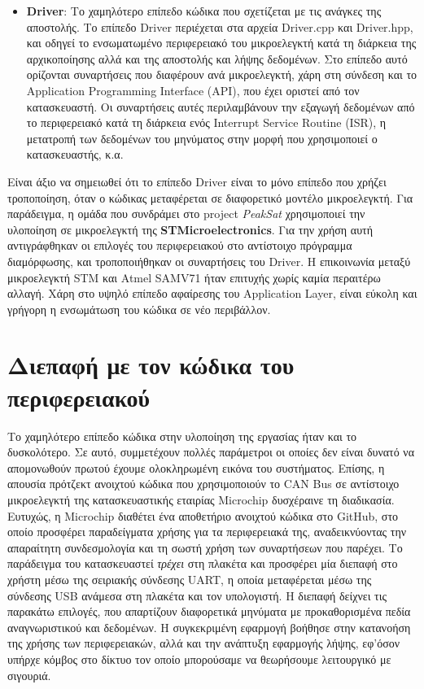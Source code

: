 \documentclass[a4paper,nobib,justified]{tufte-book}
\begin{document}
\begin{itemize}
	\item \textbf{Driver}: Το χαμηλότερο επίπεδο κώδικα που σχετίζεται με τις ανάγκες της αποστολής. Το επίπεδο Driver περιέχεται στα αρχεία Driver.cpp και Driver.hpp, και οδηγεί το ενσωματωμένο περιφερειακό του μικροελεγκτή κατά τη διάρκεια της αρχικοποίησης αλλά και της αποστολής και λήψης δεδομένων. Στο επίπεδο αυτό ορίζονται συναρτήσεις που διαφέρουν ανά μικροελεγκτή, χάρη στη σύνδεση και το Application Programming Interface (API), που έχει οριστεί από τον κατασκευαστή. Οι συναρτήσεις αυτές περιλαμβάνουν την εξαγωγή δεδομένων από το περιφερειακό κατά τη διάρκεια ενός Interrupt Service Routine (ISR), η μετατροπή των δεδομένων του μηνύματος στην μορφή που χρησιμοποιεί ο κατασκευαστής, κ.α.
\end{itemize}

Είναι άξιο να σημειωθεί ότι το επίπεδο Driver είναι το μόνο επίπεδο που χρήζει τροποποίηση, όταν ο κώδικας μεταφέρεται σε διαφορετικό μοντέλο μικροελεγκτή. Για παράδειγμα, η ομάδα που συνδράμει στο project \textit{PeakSat} χρησιμοποιεί την υλοποίηση σε μικροελεγκτή της \textbf{STMicroelectronics}. Για την χρήση αυτή αντιγράφθηκαν οι επιλογές του περιφερειακού στο αντίστοιχο πρόγραμμα διαμόρφωσης, και τροποποιήθηκαν οι συναρτήσεις του Driver. Η επικοινωνία μεταξύ μικροελεγκτή STM και Atmel SAMV71 ήταν επιτυχής χωρίς καμία περαιτέρω αλλαγή. Χάρη στο υψηλό επίπεδο αφαίρεσης του Application Layer, είναι εύκολη και γρήγορη η ενσωμάτωση του κώδικα σε νέο περιβάλλον.

\section{Διεπαφή με τον κώδικα του περιφερειακού}
Το χαμηλότερο επίπεδο κώδικα στην υλοποίηση της εργασίας ήταν και το δυσκολότερο. Σε αυτό, συμμετέχουν πολλές παράμετροι οι οποίες δεν είναι δυνατό να απομονωθούν πρωτού έχουμε ολοκληρωμένη εικόνα του συστήματος. Επίσης, η απουσία πρότζεκτ ανοιχτού κώδικα που χρησιμοποιούν το CAN Bus σε αντίστοιχο μικροελεγκτή της κατασκευαστικής εταιρίας Microchip δυσχέραινε τη διαδικασία. Ευτυχώς, η Microchip διαθέτει ένα αποθετήριο ανοιχτού κώδικα στο GitHub, στο οποίο προσφέρει παραδείγματα χρήσης για τα περιφερειακά της, αναδεικνύοντας την απαραίτητη συνδεσμολογία και τη σωστή χρήση των συναρτήσεων που παρέχει. Το παράδειγμα του κατασκευαστεί \textit{τρέχει} στη πλακέτα και προσφέρει μία διεπαφή στο χρήστη μέσω της σειριακής σύνδεσης UART, η οποία μεταφέρεται μέσω της σύνδεσης USB ανάμεσα στη πλακέτα και τον υπολογιστή. Η διεπαφή δείχνει τις παρακάτω επιλογές, που απαρτίζουν διαφορετικά μηνύματα με προκαθορισμένα πεδία αναγνωριστικού και δεδομένων. Η συγκεκριμένη εφαρμογή βοήθησε στην κατανοήση της χρήσης των περιφερειακών, αλλά και την ανάπτυξη εφαρμογής λήψης, εφ'όσον υπήρχε κόμβος στο δίκτυο τον οποίο μπορούσαμε να θεωρήσουμε λειτουργικό με σιγουριά.
\end{document}
